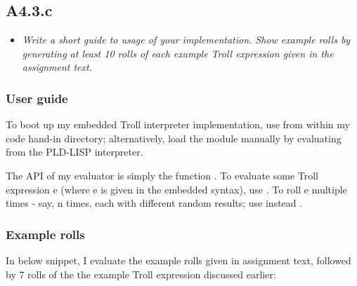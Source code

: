 \newpage
\subsection{A4.3.c}

\begin{itemize}
  \item \emph{Write a short guide to usage of your implementation. Show example
    rolls by generating at least 10 rolls of each example Troll expression given
    in the assignment text.}
\end{itemize}

\subsubsection{User guide}

To boot up my embedded Troll interpreter implementation, use  from
within my code hand-in directory; alternatively, load the module manually by
evaluating  from the PLD-LISP interpreter.

\medskip

The API of my evaluator is simply the function .
To evaluate some Troll expression \ms e (where \ms e is given in the embedded
syntax), use . To roll \ms e multiple times - say, \ms n times,
each with different random results; use instead .

\subsubsection{Example rolls}

In below snippet, I evaluate the example rolls given in assignment text,
followed by 7 rolls of the the example Troll expression discussed earlier:

